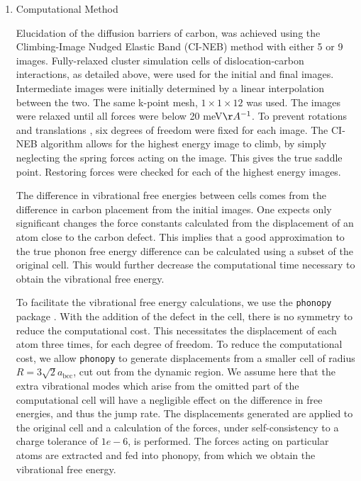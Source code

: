 \documentclass[a4paper,12pt,oneside,print,numbered,index,PageStyleIII]{PhDThesisPSnPDF}
\begin{document}
\begin{enumerate}
\item Computational Method
\label{sec:org3952113}

Elucidation of the diffusion barriers of carbon, was achieved using the Climbing-Image Nudged
Elastic Band (CI-NEB) method with either 5 or 9 images. Fully-relaxed cluster simulation cells of
dislocation-carbon interactions, as detailed above, were used for the initial and final
images. Intermediate images were initially determined by a linear interpolation between the
two. The same k-point mesh, \(1\times 1 \times 12\) was used. The images were relaxed until all
forces were below 20 meV\(\AA^{-1}\). To prevent rotations and translations \cite{berne1998classical},
six degrees of freedom were fixed for each image. The CI-NEB algorithm allows for the highest
energy image to climb, by simply neglecting the spring forces acting on the image. This gives the
true saddle point. Restoring forces were checked for each of the highest energy images.



The difference in vibrational free energies between cells comes from the difference in carbon
placement from the initial images. One expects only significant changes the force constants calculated from the
displacement of an atom close to the carbon defect. This implies that a good
approximation to the true phonon free energy difference can be calculated using a subset of the
original cell. This would further decrease the computational time necessary to obtain the
vibrational free energy.

To facilitate the vibrational free energy calculations, we use the \texttt{phonopy} package
\cite{phonopy}. With the addition of the defect in the cell, there is no symmetry to reduce the
computational cost. This necessitates the displacement of each atom three
times, for each degree of freedom. To reduce
the computational cost, we allow \texttt{phonopy} to generate displacements from a smaller cell of
radius \(R = 3\sqrt{2}a_\text{bcc}\), cut out from the dynamic region. We assume here that the
extra vibrational modes which arise from the omitted part of the computational cell will have a
negligible effect on the difference in free energies, and thus the jump rate. The displacements
generated are applied to the original cell and a calculation of the forces, under
self-consistency to a charge tolerance of \(1e-6\), is performed. The forces acting on particular
atoms are extracted and fed into phonopy, from which we obtain the vibrational free energy.



\end{enumerate}
\end{document}
